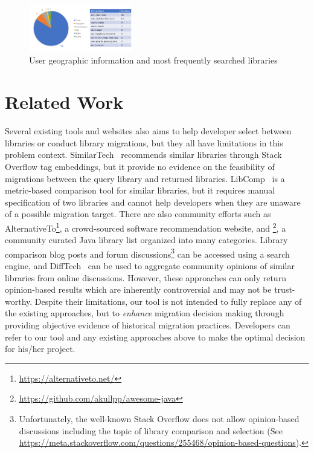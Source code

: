 \documentclass[conference,10pt]{IEEEtran}
\begin{document}
\begin{figure}[tb]
  \centering
  \includegraphics[width=0.4\textwidth]{fig/Usage.png}
  \vspace{-4mm}%
  \caption{User geographic information and most frequently searched libraries}
  \label{fig:usage}
  \vspace{-1mm}
\end{figure}

\section{Related Work}
\label{sec:related-work}

Several existing tools and websites also aims to help developer select between libraries or conduct library migrations, but they all have limitations in this problem context.
SimilarTech~\cite{chen2016similartech} recommends similar libraries through Stack Overflow tag embeddings, but it provide no evidence on the feasibility of migrations between the query library and returned libraries.
LibComp~\cite{2020FSE-LibComp} is a metric-based comparison tool for similar libraries, but it requires manual specification of two libraries and cannot help developers when they are unaware of a possible migration target.
There are also community efforts such as AlternativeTo\footnote{\url{https://alternativeto.net/}},
a crowd-sourced software recommendation website, and \footnote{\url{https://github.com/akullpp/awesome-java}},
a community curated Java library list organized into many categories.
Library comparison blog posts and forum discussions\footnote{Unfortunately, the well-known Stack Overflow does not allow opinion-based discussions including the topic of library comparison and selection (See \url{https://meta.stackoverflow.com/questions/255468/opinion-based-questions}).
} can be accessed using a search engine, and DiffTech~\cite{2020FSE-DiffTech} can be used to aggregate community opinions of similar libraries from online discussions.
However, these approaches can only return opinion-based results which are inherently controversial and may not be trust-worthy.
Despite their limitations, our tool is not intended to fully replace any of the existing approaches, 
but to \textit{enhance} migration decision making through providing objective evidence of historical migration practices. 
Developers can refer to our tool and any existing approaches above to make the optimal decision for his/her project.
\end{document}

